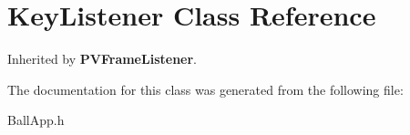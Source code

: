 \section{KeyListener Class Reference}
\label{class_o_i_s_1_1_key_listener}
Inherited by {\bf PVFrameListener}.



The documentation for this class was generated from the following file:\begin{CompactItemize}
\item 
BallApp.h\end{CompactItemize}

